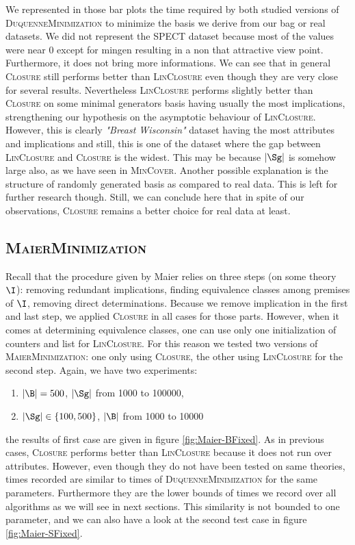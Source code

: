 We represented in those bar plots the time required by both studied versions of \textsc{DuquenneMinimization} to minimize the basis we derive from our bag or real datasets. We did not represent the SPECT dataset because most of the values
were near 0 except for mingen resulting in a non that attractive view point. Furthermore, it does not bring more informations. We can see that in general
\textsc{Closure} still performs better than \textsc{LinClosure} even though they are very close for several results. Nevertheless \textsc{LinClosure} performs slightly better than \textsc{Closure} on some minimal generators basis having usually the most implications, strengthening our hypothesis on the asymptotic behaviour of \textsc{LinClosure}. However, this is clearly \textit{"Breast Wisconsin"} dataset having the most attributes and implications and still, this is one of the dataset where the gap between \textsc{LinClosure} and \textsc{Closure} is the widest. This may be because $|\Sg|$ is somehow large
also, as we have seen in \textsc{MinCover}. Another possible explanation is the structure of randomly generated basis as compared to real data. This is left for further research though. Still, we can conclude here that 
in spite of our observations, \textsc{Closure} remains a better choice for real data at least. 

\subsection{\textsc{MaierMinimization}}

Recall that the procedure given by Maier relies on three steps (on some theory $\I$): removing redundant implications, finding equivalence classes among premises of $\I$, removing direct determinations. Because we remove implication in the first and last step, we applied \textsc{Closure} in all cases for those
parts. However, when it comes at determining equivalence classes, one can use
only one initialization of counters and list for \textsc{LinClosure}. For this
reason we tested two versions of \textsc{MaierMinimization}: one only using \textsc{Closure}, the other using \textsc{LinClosure} for the second step.
Again, we have two experiments:
\begin{enumerate}
	\item $|\B| = 500$, $|\Sg|$ from 1000 to 100000,
	\item $|\Sg| \in \{ 100, 500\}$, $|\B|$ from 1000 to 10000
\end{enumerate}
\noindent the results of first case are given in figure \ref{fig:Maier-BFixed}.
As in previous cases, \textsc{Closure} performs better than \textsc{LinClosure}
because it does not run over attributes. However, even though they do not have
been tested on same theories, times recorded are similar to times of \textsc{DuquenneMinimization} for the same parameters. Furthermore they are
the lower bounds of times we record over all algorithms as we will see in
next sections. This similarity is not bounded to one parameter, and we can
also have a look at the second test case in figure \ref{fig:Maier-SFixed}.

